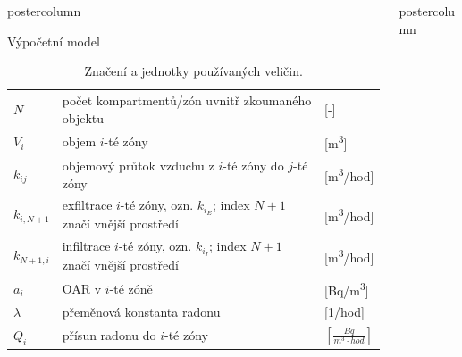 \documentclass{beamer}
\newlength{\columnheight}
\begin{document}
\begin{frame}
\begin{columns}
\begin{column}{.43\textwidth}
\begin{beamercolorbox}[center]{postercolumn}
\begin{minipage}{.98\textwidth}
{\begin{myblock}{Výpočetní model}
\begin{table}[h]
\def\arraystretch{1.1}
\scriptsize
    \centering
    \caption{Značení a jednotky používaných veličin.}
    \label{tab:veliciny}
    \begin{tabular}{lp{}l}
        \toprule
        $N$   & počet kompartmentů/zón uvnitř zkoumaného objektu&[-]\\
        $V_i$ & objem $i$-té zóny& [\si{m^3}] \\
        $k_{ij}$ & objemový průtok vzduchu z $i$-té zóny do $j$-té zóny& [\si{m^3/hod}]\\
        $k_{i, N+1}$ & exfiltrace $i$-té zóny, ozn. $k_{i_E}$; index $N+1$ značí vnější prostředí & [\si{m^3/hod}]\\
        $k_{N+1, i}$ & infiltrace $i$-té zóny, ozn. $k_{i_I}$; index $N+1$ značí vnější prostředí &[\si{m^3/hod}]\\
        $a_i$ & OAR v $i$-té zóně& [\si{Bq/m^3}] \\
        $\lambda$ & přeměnová konstanta radonu& [\si{1/hod}]\\
        $Q_i$ & přísun radonu do $i$-té zóny& $\left[\si{\frac{Bq}{m^3\cdot hod}}\right]$ \\
        \bottomrule
    \end{tabular}
\end{table}
\end{myblock}\vfill

		}\end{minipage}\end{beamercolorbox}
	\end{column}



	\begin{column}{.57\textwidth}
		\begin{beamercolorbox}[center]{postercolumn}
			\begin{minipage}{.98\textwidth} %
				\parbox[t][\columnheight]{\textwidth}{ %


}
\end{minipage}
\end{beamercolorbox}
\end{column}
\end{columns}
\end{frame}
\end{document}
